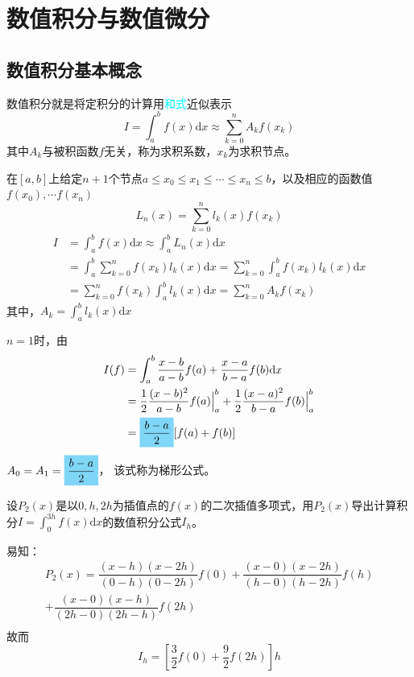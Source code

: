 \section{数值积分与数值微分}
\subsection{数值积分基本概念}
数值积分就是将定积分的计算用\textcolor{cyan}{和式}近似表示
\[
    I = \int_{a}^{b}f(x)\mathrm{d}x \approx \sum\limits_{k = 0}^{n}A_kf(x_k)
\]
其中$A_k$与被积函数$f$无关，称为求积系数，$x_k$为求积节点。

\begin{definition}[插值型求积公式]
    在$[a,b]$上给定$n+1$个节点$a\leqslant x_0\leqslant x_1\leqslant\cdots\leqslant x_n\leqslant b$，以及相应的函数值$f(x_0),\cdots f(x_n)$
    \[
        L_n(x) = \sum\limits_{k = 0}^{n}l_{k}(x)f(x_k)
    \]
    \[
        \begin{array}{ll}
            I &= \int_{a}^{b}f(x)\mathrm{d}x \approx  \int_{a}^{b} L_n(x)\mathrm{d}x\\
            &=\int_{a}^{b}\sum\limits_{k = 0}^{n}f(x_k)l_{k}(x)\mathrm{d}x=\sum\limits_{k = 0}^{n}\int_{a}^{b}f(x_k)l_{k}(x)\mathrm{d}x\\
            &=\sum\limits_{k = 0}^{n}f(x_k)\int_{a}^{b}l_{k}(x)\mathrm{d}x=\sum\limits_{k = 0}^{n}A_kf(x_k)
        \end{array}
    \]
    其中，$A_k = \int_{a}^{b}l_{k}(x)\mathrm{d} x$

    $n = 1$时，由
    \[
        \begin{aligned}
            I(f) &= \int_{a}^{b}\dfrac{x-b}{a-b}f(a) + \dfrac{x-a}{b-a}f(b)\mathrm{d}x \\
            &= \dfrac{1}{2}\dfrac{(x-b)^2}{a-b}f(a)\Big|_{a}^{b} + \dfrac{1}{2}\dfrac{(x-a)^2}{b-a}f(b)\Big|_{a}^{b}\\
            &=\colorbox{cyan!50}{$ \dfrac{b-a}{2}$}[f(a)+f(b)] 
        \end{aligned}
    \]
    $A_0 = A_1 = \colorbox{cyan!50}{$\dfrac{b-a}{2}$}$，
    该式称为\colorbox{cyan!50}{梯形公式}。
\end{definition}
\begin{example}
    设$P_2(x)$是以$0,h,2h$为插值点的$f(x)$的二次插值多项式，用$P_{2}(x)$导出计算积分$I = \int_{0}^{3h}f(x)\mathrm{d}x$的数值积分公式$I_h$。
    \begin{solution}
        易知：
        \[
            \begin{array}{l}
                P_{2}(x) = \dfrac{(x-h)(x-2h)}{(0-h)(0-2h)}f(0) + \dfrac{(x-0)(x-2h)}{(h-0)(h-2h)}f(h)\\
                +\dfrac{(x-0)(x-h)}{(2h-0)(2h-h)}f(2h)\\
            \end{array}
        \]
        故而
        \[
            I_h = \left[ \dfrac{3}{2}f(0) + \dfrac{9}{2}f(2h) \right]h
        \]
    \end{solution}
\end{example}
